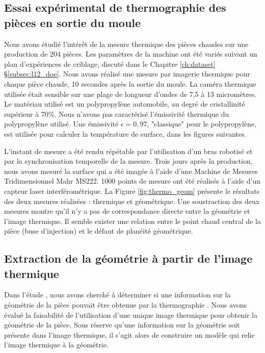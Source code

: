 \subsection{Essai expérimental de thermographie des pièces en sortie du moule}
Nous avons étudié l'intérêt de la mesure thermique des pièces chaudes sur une production de 204 pièces.
Les paramètres de la machine ont été variés suivant un plan d'expériences de criblage, discuté dans le Chapitre \ref{ch:dataset} §\ref{subsec:l12_doe}.
Nous avons réalisé une mesure par imagerie thermique pour chaque pièce chaude, 10 secondes après la sortie du moule.
La caméra thermique utilisée était sensible sur une plage de longueur d'ondes de 7,5 à 13 micromètres.
Le matériau utilisé est un polypropylène automobile, au degré de cristallinité supérieur à 70\%.
Nous n'avons pas caractérisé l'émissivité thermique du polypropylène utilisé.
Une émissivité $\epsilon=0,97$, "classique" pour le polypropylène, est utilisée pour calculer la température de surface, dans les figures suivantes.

L'instant de mesure a été rendu répétable par l'utilisation d'un bras robotisé et par la synchronisation temporelle de la mesure.
Trois jours après la production, nous avons mesuré la surface qui a été imagée à l'aide d'une Machine de Mesures Tridimensionnel Mahr MS222.
1000 points de mesure ont été réalisés à l'aide d'un capteur laser interférométrique.
La Figure \ref{fig:thermo_geom} présente le résultats des deux mesures réalisées : thermique et géométrique.
Une soustraction des deux mesures montre qu'il n'y a pas de correspondance directe entre la géométrie et l'image thermique.
Il semble exister une relation entre le point chaud central de la pièce (buse d'injection) et le défaut de planéité géométrique.

\subsection{Extraction de la géométrie à partir de l'image thermique}
Dans l'étude , nous avons cherché à déterminer si une information sur la géométrie de la pièce pouvait être obtenue par la thermographie \cite{nagorny_generative_2018}.
Nous avons évalué la faisabilité de l'utilisation d'une unique image thermique pour obtenir la géométrie de la pièce.
Sous réserve qu'une information sur la géométrie soit présente dans l'image thermique, il s'agit alors de construire un modèle qui relie l'image thermique à la géométrie.

